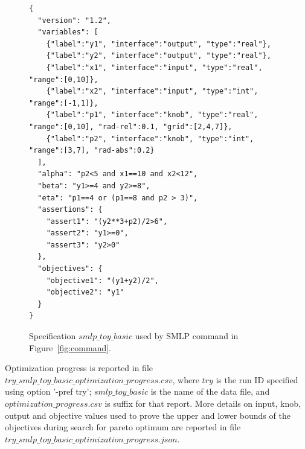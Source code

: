 \documentclass[a4paper,parskip=half]{article} %
\begin{document}
\begin{figure}%
\small
\begin{verbatim}
{
  "version": "1.2",
  "variables": [
    {"label":"y1", "interface":"output", "type":"real"},
    {"label":"y2", "interface":"output", "type":"real"},
    {"label":"x1", "interface":"input", "type":"real", "range":[0,10]},
    {"label":"x2", "interface":"input", "type":"int", "range":[-1,1]},
    {"label":"p1", "interface":"knob", "type":"real", "range":[0,10], "rad-rel":0.1, "grid":[2,4,7]},
    {"label":"p2", "interface":"knob", "type":"int", "range":[3,7], "rad-abs":0.2}
  ],
  "alpha": "p2<5 and x1==10 and x2<12",
  "beta": "y1>=4 and y2>=8",
  "eta": "p1==4 or (p1==8 and p2 > 3)",
  "assertions": {
    "assert1": "(y2**3+p2)/2>6",
    "assert2": "y1>=0",
    "assert3": "y2>0"
  },
  "objectives": {
    "objective1": "(y1+y2)/2",
    "objective2": "y1"
  }
}
\end{verbatim}
\vspace*{-1\baselineskip}
\caption{Specification $smlp\_toy\_basic$ used by SMLP command in Figure~\cref{fig:command}.}
\label{fig:spec}
\end{figure}


Optimization progress is reported in  file $try\_smlp\_toy\_basic\_optimization\_progress.csv$, where $try$ is the run ID specified using option '-pref try'; $smlp\_toy\_basic$ is the name of the data file, and $optimization\_progress.csv$ is suffix for that report. More details on input, knob, output and objective values used to prove the upper and lower bounds of the objectives during search for pareto optimum are reported in file $try\_smlp\_toy\_basic\_optimization\_progress.json$. 
\end{document}
